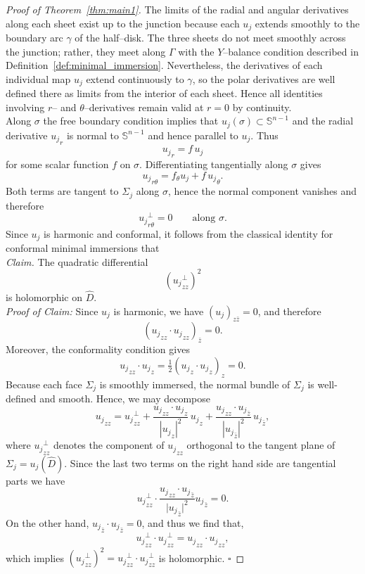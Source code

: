 \documentclass[11pt]{amsart}
\numberwithin{equation}{section}
\theoremstyle{theorem}
\theoremstyle{definition}
\numberwithin{equation}{section}
\begin{document}
\begin{proof}[Proof of Theorem~\ref{thm:main1}]
The limits of the radial and angular derivatives along each sheet exist up to the junction because each $u_j$ extends smoothly to the boundary arc $\gamma$ of the half–disk. 
The three sheets do not meet smoothly across the junction; rather, they meet along $\Gamma$ with the $Y$–balance condition described in Definition~\ref{def:minimal_immersion}. 
Nevertheless, the derivatives of each individual map $u_j$ extend continuously to $\gamma$, so the polar derivatives are well defined there as limits from the interior of each sheet.
Hence all identities involving $r$– and $\theta$–derivatives remain valid at $r=0$ by continuity. \\
Along $\sigma$ the free boundary condition implies that $u_j(\sigma)\subset \mathbb{S}^{n-1}$ and the radial derivative 
${u_j}_r$ is normal to $\mathbb{S}^{n-1}$ and hence parallel to $u_j$.
Thus
\[
{u_j}_r = f\,u_j
\]
for some scalar function $f$ on $\sigma$. Differentiating tangentially along
$\sigma$ gives
\[
{u_j}_{r\theta} = f_\theta u_j + f\,{u_j}_\theta .
\]
Both terms are tangent to $\Sigma_j$ along $\sigma$, hence the normal
component vanishes and therefore
\begin{equation}
\label{eq:perp}
{u_j}_{r\theta}^{\perp}=0
\qquad \text{along }\sigma .
\end{equation}
Since $u_j$ is harmonic and conformal, it follows from the classical identity
for conformal minimal immersions that\\
\emph{Claim.} The quadratic differential
\[
({u_j}_{zz}^{\perp})^2
\]
is holomorphic on $\hat D$.\\
\emph{Proof of Claim:} Since $u_j$ is harmonic, we have $(u_j)_{z\bar z}=0$, and therefore
\[
({u_j}_{zz} \cdot {u_j}_{zz})_{\bar{z}} = 0.
\]
Moreover, the conformality condition gives
\[
{u_j}_{zz} \cdot {u_j}_z = \tfrac{1}{2}({u_j}_z \cdot {u_j}_z)_z = 0.
\]
Because each face $\Sigma_j$ is smoothly immersed, 
the normal bundle of $\Sigma_j$ is well-defined and smooth. 
Hence, we may decompose
\[
{u_j}_{zz}
= {u_j}_{zz}^{\perp}
+ \frac{{u_j}_{zz} \cdot {u_j}_z}{|{u_j}_z|^2}\,{u_j}_z
+ \frac{{u_j}_{zz} \cdot {u_j}_{\bar{z}}}{|{u_j}_{\bar{z}}|^2}\,{u_j}_{\bar{z}},
\]
where ${u_j}_{zz}^{\perp}$ denotes the component of ${u_j}_{zz}$ orthogonal to the tangent plane of 
$\Sigma_j = u_j(\hat{D})$.
Since the last two terms on the right hand side are tangential parts we have 
 $$
 {u_j}_{zz}^{\perp} \cdot \frac{{u_j}_{zz}\cdot {u_j}_{\bar{z}}}{\vert {u_j}_{\bar{z}}\vert^2} {u_j}_{\bar{z}} =0.
 $$
 On the other hand, ${u_j}_{\bar{z}}\cdot {u_j}_{\bar{z}}=0$, and thus we find that, 
 $$
 {u_j}_{zz}^{\perp} \cdot {u_j}_{zz}^{\perp} = {u_j}_{zz} \cdot {u_j}_{zz},
 $$
 which implies $({u_j}_{zz}^{\perp})^2={u_j}_{zz}^{\perp} \cdot {u_j}_{zz}^{\perp}$ is holomorphic. \hfill $\square$
 

\end{proof}
\end{document}
